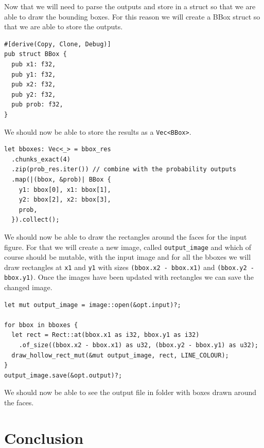 \documentclass{book}
\begin{document}
Now that we will need to parse the outputs and store in a struct so that we are able to draw the bounding boxes. For this reason we will create a BBox struct so that we are able to store the outputs.

\begin{lstlisting}[caption={chapter6/face-detection-tf/src/main.rs}, basicstyle=\small]
#[derive(Copy, Clone, Debug)]
pub struct BBox {
  pub x1: f32,
  pub y1: f32,
  pub x2: f32,
  pub y2: f32,
  pub prob: f32,
}
\end{lstlisting}

We should now be able to store the results as a \lstinline{Vec<BBox>}.

\begin{lstlisting}[caption={chapter6/face-detection-tf/src/main.rs}, basicstyle=\small]
let bboxes: Vec<_> = bbox_res
  .chunks_exact(4)
  .zip(prob_res.iter()) // combine with the probability outputs
  .map(|(bbox, &prob)| BBox {
    y1: bbox[0], x1: bbox[1],
    y2: bbox[2], x2: bbox[3],
    prob,
  }).collect();
\end{lstlisting}

We should now be able to draw the rectangles around the faces for the input figure. For that we will create a new image, called \lstinline{output_image} and which of course should be mutable, with the input image and for all the bboxes we will draw rectangles at \lstinline{x1} and \lstinline{y1} with sizes \lstinline{(bbox.x2 - bbox.x1)} and \lstinline{(bbox.y2 - bbox.y1)}. Once the images have been updated with rectangles we can save the changed image.

\begin{lstlisting}[caption={chapter6/face-detection-tf/src/main.rs}, basicstyle=\small]
let mut output_image = image::open(&opt.input)?;

for bbox in bboxes {
  let rect = Rect::at(bbox.x1 as i32, bbox.y1 as i32)
    .of_size((bbox.x2 - bbox.x1) as u32, (bbox.y2 - bbox.y1) as u32);
  draw_hollow_rect_mut(&mut output_image, rect, LINE_COLOUR);
}
output_image.save(&opt.output)?;
\end{lstlisting}

We should now be able to see the output file in folder with boxes drawn around the faces.

\label{sec:tensorflow_and_face_detection}


\section{Conclusion}%
\end{document}
